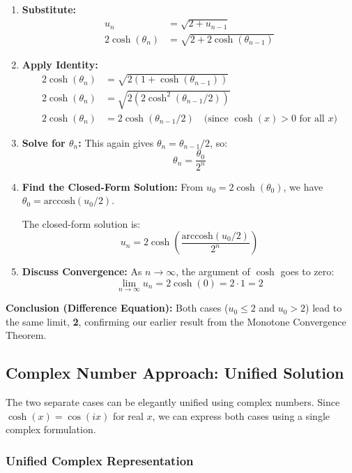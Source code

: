 \documentclass[12pt,a4paper]{article}
\theoremstyle{definition}
\begin{document}
\begin{enumerate}[label=\arabic*.]
    \item \textbf{Substitute:}
    \begin{align*}
    u_n &= \sqrt{2 + u_{n-1}}\\
    2\cosh(\theta_n) &= \sqrt{2 + 2\cosh(\theta_{n-1})}
    \end{align*}
    
    \item \textbf{Apply Identity:}
    \begin{align*}
    2\cosh(\theta_n) &= \sqrt{2(1 + \cosh(\theta_{n-1}))}\\
    2\cosh(\theta_n) &= \sqrt{2(2\cosh^2(\theta_{n-1}/2))}\\
    2\cosh(\theta_n) &= 2\cosh(\theta_{n-1}/2) \quad \text{(since $\cosh(x) > 0$ for all $x$)}
    \end{align*}
    
    \item \textbf{Solve for $\theta_n$:}
    This again gives $\theta_n = \theta_{n-1}/2$, so:
    \[
    \theta_n = \frac{\theta_0}{2^n}
    \]
    
    \item \textbf{Find the Closed-Form Solution:}
    From $u_0 = 2\cosh(\theta_0)$, we have $\theta_0 = \text{arccosh}(u_0/2)$.
    
    The closed-form solution is:
    \[
    u_n = 2\cosh\left(\frac{\text{arccosh}(u_0/2)}{2^n}\right)
    \]
    
    \item \textbf{Discuss Convergence:}
    As $n \to \infty$, the argument of $\cosh$ goes to zero:
    \[
    \lim_{n \to \infty} u_n = 2\cosh(0) = 2 \cdot 1 = 2
    \]
\end{enumerate}

\textbf{Conclusion (Difference Equation):} Both cases ($u_0 \le 2$ and $u_0 > 2$) lead to the same limit, \textbf{2}, confirming our earlier result from the Monotone Convergence Theorem.

\subsection{Complex Number Approach: Unified Solution}

The two separate cases can be elegantly unified using complex numbers. Since $\cosh(x) = \cos(ix)$ for real $x$, we can express both cases using a single complex formulation.

\subsubsection{Unified Complex Representation}
\end{document}
